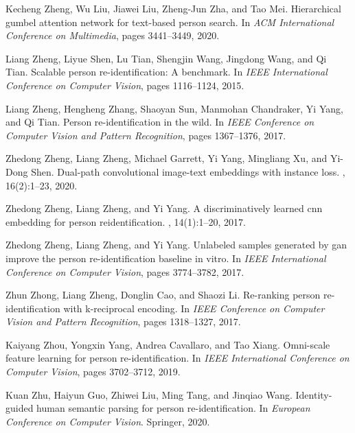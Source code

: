 \documentclass[10pt,twocolumn,letterpaper]{article}
\begin{document}
\begin{thebibliography}{10}
Kecheng Zheng, Wu Liu, Jiawei Liu, Zheng-Jun Zha, and Tao Mei.
\newblock Hierarchical gumbel attention network for text-based person search.
\newblock In {\em ACM International Conference on Multimedia}, pages
  3441--3449, 2020.

Liang Zheng, Liyue Shen, Lu Tian, Shengjin Wang, Jingdong Wang, and Qi Tian.
\newblock Scalable person re-identification: A benchmark.
\newblock In {\em IEEE International Conference on Computer Vision}, pages
  1116--1124, 2015.

Liang Zheng, Hengheng Zhang, Shaoyan Sun, Manmohan Chandraker, Yi Yang, and Qi
  Tian.
\newblock Person re-identification in the wild.
\newblock In {\em IEEE Conference on Computer Vision and Pattern Recognition},
  pages 1367--1376, 2017.

Zhedong Zheng, Liang Zheng, Michael Garrett, Yi Yang, Mingliang Xu, and Yi-Dong
  Shen.
\newblock Dual-path convolutional image-text embeddings with instance loss.
, 16(2):1--23, 2020.

Zhedong Zheng, Liang Zheng, and Yi Yang.
\newblock A discriminatively learned cnn embedding for person reidentification.
, 14(1):1--20, 2017.

Zhedong Zheng, Liang Zheng, and Yi Yang.
\newblock Unlabeled samples generated by gan improve the person
  re-identification baseline in vitro.
\newblock In {\em IEEE International Conference on Computer Vision}, pages
  3774--3782, 2017.

Zhun Zhong, Liang Zheng, Donglin Cao, and Shaozi Li.
\newblock Re-ranking person re-identification with k-reciprocal encoding.
\newblock In {\em IEEE Conference on Computer Vision and Pattern Recognition},
  pages 1318--1327, 2017.

Kaiyang Zhou, Yongxin Yang, Andrea Cavallaro, and Tao Xiang.
\newblock Omni-scale feature learning for person re-identification.
\newblock In {\em IEEE International Conference on Computer Vision}, pages
  3702--3712, 2019.

Kuan Zhu, Haiyun Guo, Zhiwei Liu, Ming Tang, and Jinqiao Wang.
\newblock Identity-guided human semantic parsing for person re-identification.
\newblock In {\em European Conference on Computer Vision}. Springer, 2020.

\end{thebibliography}
\end{document}

